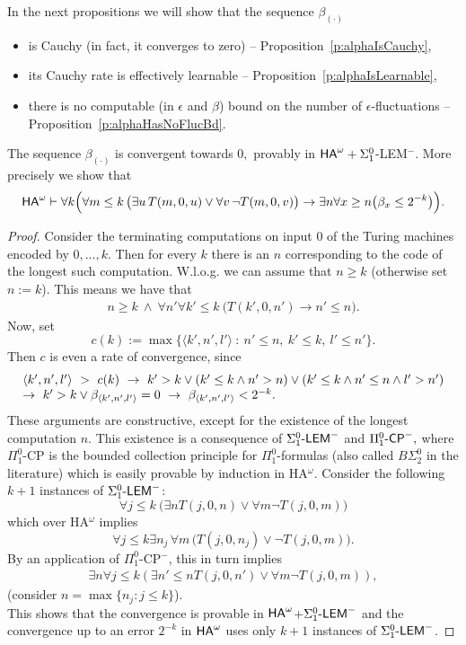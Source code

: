 In the next propositions we will show that the sequence $\beta_{(\cdot)}$
\begin{itemize}
\item is Cauchy (in fact, it converges to zero) -- 
Proposition~\ref{p:alphaIsCauchy},
\item its Cauchy rate is effectively learnable -- Proposition~\ref{p:alphaIsLearnable},
\item there is no computable (in $\epsilon$ and $\beta$) bound on the number of $\epsilon$-fluctuations -- Proposition~\ref{p:alphaHasNoFlucBd}.
\end{itemize}

\begin{prop}\label{p:alphaIsCauchy}
The sequence $\beta_{(\cdot)}$ is convergent towards $0,$ provably in 
{\rm ${\textsf{\upshape HA}}^\omega+\Sigma^0_1$-LEM$^-$}. More precisely we show that
\[ 
{\textsf{\upshape HA}}^\omega
\vdash 
\forall k \Big( 
\forall m\leq k \,\big(\exists u\,T(m,0,u) \vee \forall v\,\neg T(m,0,v)\big)\rightarrow \exists n \forall x\geq n\big(\beta_x\leq2^{-k}\big)\Big).
 \]
\end{prop}
\begin{proof}
Consider the terminating computations on input $0$ of the Turing machines encoded by $0,\ldots,k$. Then for every $k$ there is an $n$ corresponding to the
code of the longest such computation. W.l.o.g. we can assume that $n\geq k$ (otherwise set $n:=k$). This means we have that
\begin{align}
n\geq k\ \wedge\ \forall n'\forall k'\leq k\ \big( T(k',0,n')\rightarrow n'\leq n\big).\label{e:ac-n}
\end{align}
Now, set \[ c(k):=\max\{ \langle k',n',l' \rangle\ :\ n'\leq n,\ k'\leq k,\ l'\leq n'\}.\]
Then $c$ is even a rate of convergence, since
\[\ba{l} 
\langle k',n',l'\rangle\ >\ c(k)\ \rightarrow\ k'>k \vee (k'\le k \wedge n'>n)
\vee (k'\le k\wedge n'\le n\wedge l'>n')\\  
\rightarrow\ k'>k \vee \beta_{\langle k',n',l'\rangle}=0 \ \rightarrow\ \beta_{\langle k',n',l'\rangle} < 2^{-k}. \ea 
\]
These arguments are constructive, except for the existence of the longest computation $n$.
This existence is a consequence of $\Sigma^0_1\textsf{\upshape -LEM}^-$ and $\Pi^0_1\textsf{\upshape -}\textsf{\upshape CP}^-,$ where 
$\Pi^0_1$-CP is the bounded collection principle for $\Pi^0_1$-formulas 
(also called $B\Sigma^0_2$ in the literature) which is easily provable by 
induction in HA$^{\omega}$.
Consider the following $k+1$ instances of $\Sigma^0_1\textsf{\upshape -LEM}^-$:
\[ \forall j\leq k\ \big( \exists n T(j,0,n) \vee \forall m \neg T(j,0,m)\big) \] which over HA$^{\omega}$ implies 
\[ \forall j\leq k \exists n_j \,\forall m\,\big( T(j,0,n_j) \vee \neg T(j,0,m)\big). \] 
By an application of $\Pi^0_1$-CP$^-$, this in turn
implies
\begin{align*}
\exists n\forall j\leq k ( \exists n'\leq n T(j,0,n') \vee \forall m \neg T(j,0,m) ),
\end{align*}
 (consider $n=\max \{n_j : j\leq k\}$).\\
This shows that the convergence is provable in ${\textsf{\upshape HA}}^\omega$+$\Sigma^0_1\textsf{\upshape -LEM}^-$ and the convergence up to an error $2^{-k}$ in ${\textsf{\upshape HA}}^\omega$ uses
only $k+1$ instances of $\Sigma^0_1\textsf{\upshape -LEM}^-$.
\end{proof}

